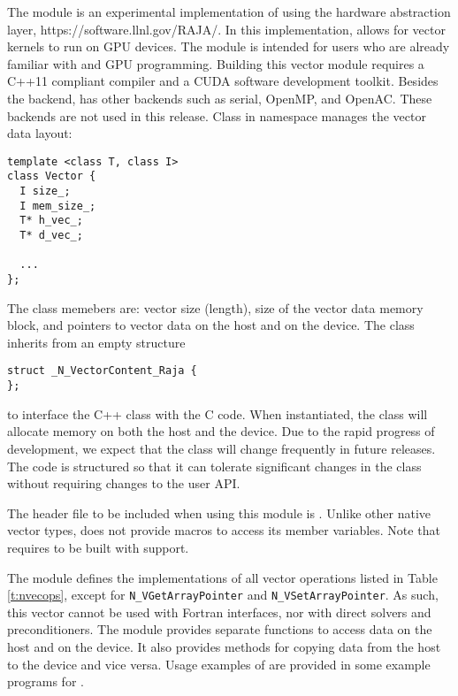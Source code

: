 %
The {\nvecraja} module is an experimental implementation of {\nvector} using the {\raja} 
hardware abstraction layer, https://software.llnl.gov/RAJA/. In this implementation, {\raja}
allows for {\sundials} vector kernels to run on GPU devices. The module is intended for users 
who are already familiar with {\raja} and GPU programming. Building this vector 
module requires a C++11 compliant compiler and a CUDA software development toolkit. 
Besides the {\cuda} backend, {\raja} has other backends such as serial, OpenMP, 
and OpenAC. These backends are not used in this {\sundials} release.
Class  in namespace  manages the vector data layout:
\begin{verbatim} 
template <class T, class I>
class Vector {
  I size_;
  I mem_size_;
  T* h_vec_;
  T* d_vec_;
  
  ...
};
\end{verbatim}
The class memebers are: vector size (length), size of the vector data memory block, 
and pointers to vector data on the host and on the device. The class 
inherits from an empty structure
\begin{verbatim} 
struct _N_VectorContent_Raja {
};
\end{verbatim}
to interface the C++ class with the {\nvector} C code. When instantiated, the class
 will allocate memory on both the host and the device. Due to the rapid
progress of {\raja} development, we expect that the 
class will change frequently in future {\sundials} releases. The code is
structured so that it can tolerate significant changes in the 
 class without requiring changes to the user API.


The header file to be included when using this module is .
Unlike other native {\sundials} vector types, {\nvecraja} does not provide macros 
to access its member variables.
Note that {\nvecraja} requires {\sundials} to be built with {\mpi} support.


The {\nvecraja} module defines the implementations of all vector operations listed 
in Table \ref{t:nvecops}, except for \verb|N_VGetArrayPointer| and 
\verb|N_VSetArrayPointer|. 
As such, this vector cannot be used with {\sundials} Fortran interfaces,
nor with {\sundials} direct solvers and preconditioners. 
The {\nvecraja} module provides separate functions to access data on the host
and on the device. It also provides methods for copying data from the host to 
the device and vice versa. Usage examples of {\nvecraja} are provided in
some example programs for {\cvode} \cite{cvode_ex}.

